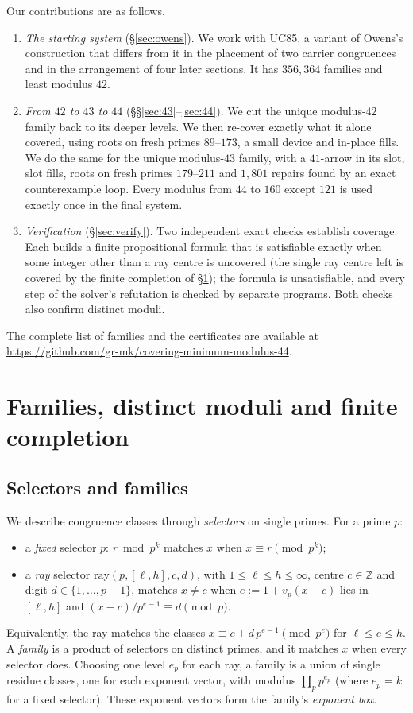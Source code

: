 \documentclass[11pt]{amsart}
\theoremstyle{definition}
\theoremstyle{remark}
\newcommand{\Z}{\mathbb{Z}}
\begin{document}
\noindent Our contributions are as follows.
\begin{enumerate}
\item \emph{The starting system} (§\ref{sec:owens}). We work with UC85, a variant of Owens's construction that
  differs from it in the placement of two carrier congruences and in the arrangement of four later sections. It
  has $356{,}364$ families and least modulus $42$.
\item \emph{From $42$ to $43$ to $44$} (§§\ref{sec:43}–\ref{sec:44}). We cut the unique modulus-$42$ family back to
  its deeper levels. We then re-cover exactly what it alone covered, using roots on fresh primes $89$–$173$, a small
  device and in-place fills. We do the same for the unique modulus-$43$ family, with a $41$-arrow in its slot, slot
  fills, roots on fresh primes $179$–$211$ and $1{,}801$ repairs found by an exact counterexample loop. Every modulus
  from $44$ to $160$ except $121$ is used exactly once in the final system.
\item \emph{Verification} (§\ref{sec:verify}). Two independent exact checks establish coverage. Each builds a finite
  propositional formula that is satisfiable exactly when some integer other than a ray centre is uncovered (the
  single ray centre left is covered by the finite completion of §\ref{sec:prelim}); the formula is unsatisfiable,
  and every step of the solver's refutation is checked by separate programs. Both checks also confirm distinct
  moduli.
\end{enumerate}

\noindent The complete list of families and the certificates are available at
\url{https://github.com/gr-mk/covering-minimum-modulus-44}.

\section{Families, distinct moduli and finite completion}\label{sec:prelim}

\subsection*{Selectors and families}
We describe congruence classes through \emph{selectors} on single primes. For a prime $p$:
\begin{itemize}
\item a \emph{fixed} selector $p{:}\,r \bmod p^k$ matches $x$ when $x \equiv r \pmod{p^k}$;
\item a \emph{ray} selector $\mathrm{ray}(p,[\ell,h],c,d)$, with $1\le \ell\le h\le\infty$, centre $c\in\Z$ and
  digit $d\in\{1,\dots,p-1\}$, matches $x \ne c$ when $e := 1+v_p(x-c)$ lies in $[\ell,h]$ and
  $(x-c)/p^{e-1} \equiv d \pmod p$.
\end{itemize}
Equivalently, the ray matches the classes $x \equiv c + d\,p^{e-1} \pmod{p^e}$ for $\ell\le e\le h$. A \emph{family}
is a product of selectors on distinct primes, and it matches $x$ when every selector does. Choosing one level $e_p$
for each ray, a family is a union of single residue classes, one for each exponent vector, with modulus
$\prod_p p^{e_p}$ (where $e_p=k$ for a fixed selector). These exponent vectors form the family's \emph{exponent box}.
\end{document}
